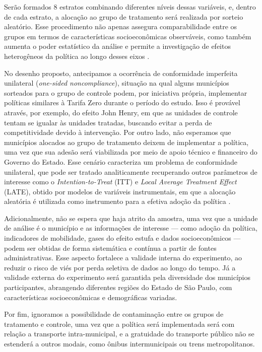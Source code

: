 Serão formados 8 estratos combinando diferentes níveis dessas variáveis, e, dentro de cada estrato, a alocação ao grupo de tratamento será realizada por sorteio aleatório. Esse procedimento não apenas assegura comparabilidade entre os grupos em termos de características socioeconômicas observáveis, como também aumenta o poder estatístico da análise e permite a investigação de efeitos heterogêneos da política ao longo desses eixos \cite{duflo2008toolkit, angrist2009mostly}.

No desenho proposto, antecipamos a ocorrência de conformidade imperfeita unilateral (\textit{one-sided noncompliance}), situação na qual alguns municípios sorteados para o grupo de controle podem, por iniciativa própria, implementar políticas similares à Tarifa Zero durante o período do estudo. Isso é provável através, por exemplo, do efeito John Henry, em que as unidades de controle tentam se igualar às unidades tratadas, buscando evitar a perda de competitividade devido à intervenção. Por outro lado, não esperamos que municípios alocados ao grupo de tratamento deixem de implementar a política, uma vez que sua adesão será viabilizada por meio de apoio técnico e financeiro do Governo do Estado. Esse cenário caracteriza um problema de conformidade unilateral, que pode ser tratado analiticamente recuperando outros parâmetros de interesse como o \textit{Intention-to-Treat} (ITT) e \textit{Local Average Treatment Effect} (LATE), obtido por modelos de variáveis instrumentais, em que a alocação aleatória é utilizada como instrumento para a efetiva adoção da política \cite{duflo2008toolkit,glewwe2022impact,
angrist2009mostly}.

Adicionalmente, não se espera que haja atrito da amostra, uma vez que a unidade de análise é o município e as informações de interesse — como adoção da política, indicadores de mobilidade, gases do efeito estufa e dados socioeconômicos — podem ser obtidas de forma sistemática e contínua a partir de fontes administrativas. Esse aspecto fortalece a validade interna do experimento, ao reduzir o risco de viés por perda seletiva de dados ao longo do tempo. Já a validade externa do experimento será garantida pela diversidade dos municípios participantes, abrangendo diferentes regiões do Estado de São Paulo, com características socioeconômicas e demográficas variadas. 

Por fim, ignoramos a possibilidade de contaminação entre os grupos de tratamento e controle, uma vez que a política será implementada será com relação a transporte intra-municipal, e a gratuidade do transporte público não se estenderá a outros modais, como ônibus intermunicipais ou trens metropolitanos. 

